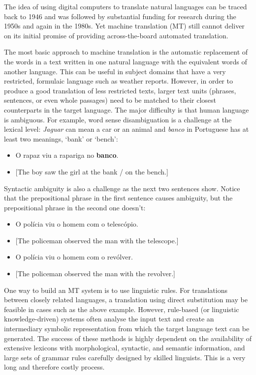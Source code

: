 \begin{multicols}{2}
The idea of using digital computers to translate natural languages can be traced back to 1946 and was followed by substantial funding for research during the 1950s and again in the 1980s. 
Yet machine translation (MT) still cannot deliver on its initial promise of providing across-the-board automated translation.  


The most basic approach to machine translation is the automatic replacement of the words in a text written in one natural language with the equivalent words of another language. This can be useful in subject domains that have a very restricted, formulaic language such as weather reports.
However, in order to produce a good translation of less restricted texts, larger text units (phrases, sentences, or even whole passages) need to be matched to their closest counterparts in the target language. The major difficulty is that human language is ambiguous. For example, word sense disambiguation is a challenge at the lexical level: \textit{Jaguar} can mean a car or an animal and \textit{banco} in Portuguese has at least two meanings, ‘bank’ or ‘bench’:\\

\begin{itemize}
\item O rapaz viu a rapariga no \textbf{banco}.
\item  {[}The boy saw the girl at the bank / on the bench.{]}
\end{itemize}

Syntactic ambiguity is also a challenge as the next two sentences show. Notice that the prepositional phrase in the first sentence causes ambiguity, but the prepositional phrase in the second one doesn't:\\

\begin{itemize}
\item O polícia viu o homem com o telescópio.
\item {[}The policeman observed the man with the telescope.{]}
\item O polícia viu o homem com o revólver.
\item {[}The policeman observed the man with the revolver.{]}
\end{itemize}

One way to build an MT system is to use linguistic rules. For translations between closely related languages, a translation using direct substitution may be feasible in cases such as the above example. However, rule-based (or linguistic knowledge-driven) systems often analyse the input text and create an intermediary symbolic representation from which the target language text can be generated. The success of these methods is highly dependent on the availability of extensive lexicons with morphological, syntactic, and semantic information, and large sets of grammar rules carefully designed by skilled linguists. This is a very long and therefore costly process.


\end{multicols}
